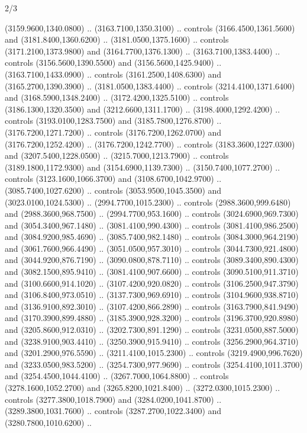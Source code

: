 \begin{flagdescription}{2/3}
\begin{scope}[shift={(0.5\flaglength,0.5)},scale=\flagwidth/130]
\begin{scope}[y=0.01mm, x=0.01mm,shift={(-3365,-2250)}]
  (3159.9600,1340.0800) .. (3163.7100,1350.3100) .. controls
  (3166.4500,1361.5600) and (3181.8400,1360.6200) .. (3181.0500,1375.1600) ..
  controls (3171.2100,1373.9800) and (3164.7700,1376.1300) ..
  (3163.7100,1383.4400) .. controls (3156.5600,1390.5500) and
  (3156.5600,1425.9400) .. (3163.7100,1433.0900) .. controls
  (3161.2500,1408.6300) and (3165.2700,1390.3900) .. (3181.0500,1383.4400) ..
  controls (3214.4100,1371.6400) and (3168.5900,1348.2400) ..
  (3172.4200,1325.5100) .. controls (3186.1300,1320.3500) and
  (3212.6600,1311.1700) .. (3198.4000,1292.4200) .. controls
  (3193.0100,1283.7500) and (3185.7800,1276.8700) .. (3176.7200,1271.7200) ..
  controls (3176.7200,1262.0700) and (3176.7200,1252.4200) ..
  (3176.7200,1242.7700) .. controls (3183.3600,1227.0300) and
  (3207.5400,1228.0500) .. (3215.7000,1213.7900) .. controls
  (3189.1800,1172.9300) and (3154.6900,1139.7300) .. (3150.7400,1077.2700) ..
  controls (3123.1600,1066.3700) and (3108.6700,1042.9700) ..
  (3085.7400,1027.6200) .. controls (3053.9500,1045.3500) and
  (3023.0100,1024.5300) .. (2994.7700,1015.2300) .. controls
  (2988.3600,999.6480) and (2988.3600,968.7500) .. (2994.7700,953.1600) ..
  controls (3024.6900,969.7300) and (3054.3400,967.1480) .. (3081.4100,990.4300)
  .. controls (3081.4100,986.2500) and (3084.9200,985.4690) ..
  (3085.7400,982.1480) .. controls (3084.3000,964.2190) and (3061.7600,966.4490)
  .. (3051.0500,957.3010) .. controls (3044.7300,921.4800) and
  (3044.9200,876.7190) .. (3090.0800,878.7110) .. controls (3089.3400,890.4300)
  and (3082.1500,895.9410) .. (3081.4100,907.6600) .. controls
  (3090.5100,911.3710) and (3100.6600,914.1020) .. (3107.4200,920.0820) ..
  controls (3106.2500,947.3790) and (3106.8400,973.0510) .. (3137.7300,969.6910)
  .. controls (3104.9600,938.8710) and (3136.9100,892.3010) ..
  (3107.4200,866.2890) .. controls (3163.7900,841.9490) and (3170.3900,899.4880)
  .. (3185.3900,928.3200) .. controls (3196.3700,920.8980) and
  (3205.8600,912.0310) .. (3202.7300,891.1290) .. controls (3231.0500,887.5000)
  and (3238.9100,903.4410) .. (3250.3900,915.9410) .. controls
  (3256.2900,964.3710) and (3201.2900,976.5590) .. (3211.4100,1015.2300) ..
  controls (3219.4900,996.7620) and (3233.0500,983.5200) .. (3254.7300,977.9690)
  .. controls (3254.4100,1011.3700) and (3254.4500,1044.4100) ..
  (3267.7000,1064.8800) .. controls (3278.1600,1052.2700) and
  (3265.8200,1021.8400) .. (3272.0300,1015.2300) .. controls
  (3277.3800,1018.7900) and (3284.0200,1041.8700) .. (3289.3800,1031.7600) ..
  controls (3287.2700,1022.3400) and (3280.7800,1010.6200) ..

\end{scope}
\end{scope}
\end{flagdescription}
